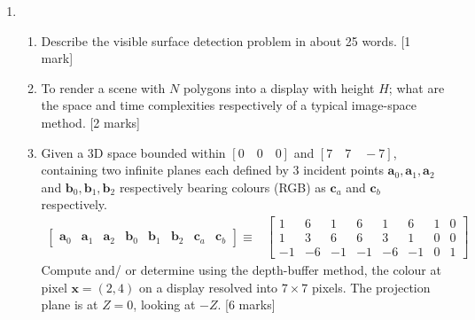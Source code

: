 \documentclass[11pt]{tiet-question-paper}
\begin{document}
\begin{enumerate}[resume]
\item \begin{enumerate}
\item Describe the visible surface detection problem in
about 25 words. \hfill [1 mark]
\item To render a scene with \(N\) polygons into a
display with height \(H\); what are the space and
time complexities respectively of a typical
image-space method. \hfill [2 marks]
\item Given a 3D space bounded within \([0\quad0\quad0]\)
and \([7\quad7\quad-7]\), containing two infinite
planes each defined by 3 incident points
\(\mathbf{a}_0, \mathbf{a}_1, \mathbf{a}_2\) and
\(\mathbf{b}_0, \mathbf{b}_1, \mathbf{b}_2\)
respectively bearing colours (RGB) as
\(\mathbf{c}_a\) and \(\textbf{c}_b\) respectively.
\begin{align*}
  \begin{bmatrix}
    \mathbf{a}_0&\mathbf{a}_1&\mathbf{a}_2
    &\mathbf{b}_0&\mathbf{b}_1&\mathbf{b}_2
    &\mathbf{c}_a&\mathbf{c}_b
  \end{bmatrix}\equiv
  &\begin{bmatrix}
    1&6&1&6&1&6&1&0 \\
    1&3&6&6&3&1&0&0 \\
    -1&-6&-1&-1&-6&-1&0&1
  \end{bmatrix}
\end{align*}
Compute and/ or determine using the depth-buffer
method, the colour at pixel \(\mathbf{x}=(2,4)\) on
a display resolved into \(7\times7\) pixels. The
projection plane is at \(Z=0\), looking at
\(-Z\). \hfill [6 marks]
\end{enumerate}
\end{enumerate}

\bvrhrule
\end{document}
